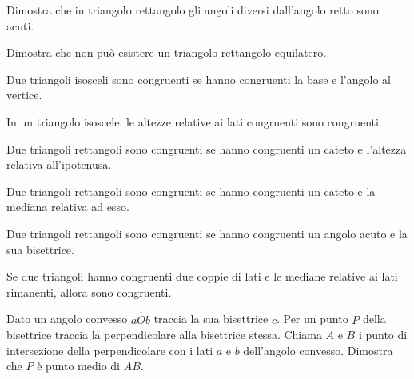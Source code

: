 \begin{multicols}{2}

\begin{esercizio}
\label{ese:3.53}
Dimostra che in triangolo rettangolo gli angoli diversi dall'angolo 
retto sono acuti.
\end{esercizio}

\begin{esercizio}
\label{ese:3.54}
Dimostra che non può esistere un triangolo rettangolo equilatero.
\end{esercizio}

\begin{esercizio}
\label{ese:3.55}
Due triangoli isosceli sono congruenti se hanno congruenti la base e 
l'angolo al vertice.
\end{esercizio}

\begin{esercizio}
\label{ese:3.56}
In un triangolo isoscele, le altezze relative ai lati congruenti sono 
congruenti. 
\end{esercizio}

\begin{esercizio}
\label{ese:3.57}
Due triangoli rettangoli sono congruenti se hanno congruenti un 
cateto e l'altezza relativa all'ipotenusa.
\end{esercizio}

\begin{esercizio}
\label{ese:3.58}
Due triangoli rettangoli sono congruenti se hanno congruenti un 
cateto e la mediana relativa ad esso.
\end{esercizio}

\begin{esercizio}
\label{ese:3.59}
Due triangoli rettangoli sono congruenti se hanno congruenti un 
angolo acuto e la sua bisettrice.
\end{esercizio}

\begin{esercizio}
\label{ese:3.60}
Se due triangoli hanno congruenti due coppie di lati e le mediane 
relative ai lati rimanenti, allora sono congruenti.
\end{esercizio}

\begin{esercizio}
\label{ese:3.69}
Dato un angolo convesso $a\widehat{O}b$ traccia la sua bisettrice 
$c$. Per un punto $P$ della bisettrice traccia la perpendicolare alla 
bisettrice stessa. Chiama $A$ e $B$ i punto di intersezione della 
perpendicolare con i lati $a$ e $b$ dell'angolo convesso. Dimostra 
che $P$ è punto medio di $AB$.
\end{esercizio}


\end{multicols}
